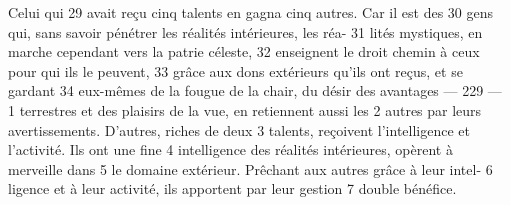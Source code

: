 Celui qui	 
29	 	avait reçu cinq talents en gagna cinq autres. Car il est des	 
30	 	gens qui, sans savoir pénétrer les réalités intérieures, les réa-	 
31	 	lités mystiques, en marche cependant vers la patrie céleste,	 
32	 	enseignent le droit chemin à ceux pour qui ils le peuvent,	 
33	 	grâce aux dons extérieurs qu'ils ont reçus, et se gardant	 
34	 	eux-mêmes de la fougue de la chair, du désir des avantages	 
 	--- 229 ---	 
1	 	terrestres et des plaisirs de la vue, en retiennent aussi les	 
2	 	autres par leurs avertissements. D'autres, riches de deux	 
3	 	talents, reçoivent l'intelligence et l'activité. Ils ont une fine	 
4	 	intelligence des réalités intérieures, opèrent à merveille dans	 
5	 	le domaine extérieur. Prêchant aux autres grâce à leur intel-	 
6	 	ligence et à leur activité, ils apportent par leur gestion	 
7	 	double bénéfice.